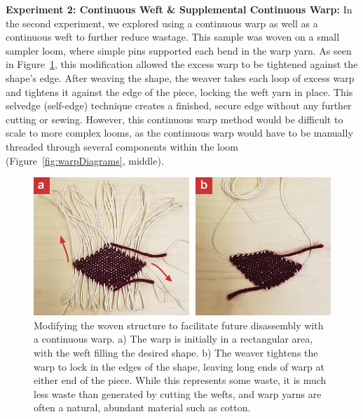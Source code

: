 \textbf{Experiment 2: Continuous Weft \& Supplemental Continuous Warp:} In the second experiment, we explored using a continuous warp as well as a continuous weft to further reduce wastage. This sample was woven on a small sampler loom, where simple pins supported each bend in the warp yarn. %
As seen in Figure~\ref{fig:warptightening}, this modification allowed the excess warp to be tightened against the shape's edge. After weaving the shape, the weaver takes each loop of excess warp and tightens it against the edge of the piece, locking the weft yarn in place. This selvedge (self-edge) technique creates a finished, secure edge without any further cutting or sewing. However, this continuous warp method would be difficult to scale to more complex looms, as the continuous warp would have to be manually threaded through several components within the loom (Figure~\ref{fig:warpDiagrams}, middle).

\begin{figure}[hb!]
    \centering
    \includegraphics[width=\linewidth]{figs/UF_warptightening.png}
    \caption[Before and after photo of a warp-tightening method to facilitate shaped weaving.]{Modifying the woven structure to facilitate future disassembly with a continuous warp. a) The warp is initially in a rectangular area, with the weft filling the desired shape. b) The weaver tightens the warp to lock in the edges of the shape, leaving long ends of warp at either end of the piece. While this represents some waste, it is much less waste than generated by cutting the wefts, and warp yarns are often a natural, abundant material such as cotton.}
    \label{fig:warptightening}
\end{figure}

